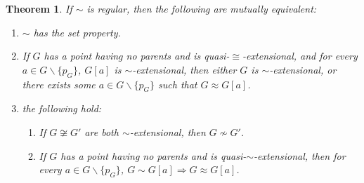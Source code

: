 \documentclass{amsart}
\newtheorem{theorem}{Theorem}
\begin{document}
\begin{theorem}
    If $\sim$ is regular, then the following are mutually equivalent:
    \begin{enumerate}[label=(\Roman*)]
        \item $\sim$ has the set property.
        \item If $G$ has a point having no parents and is quasi-$\cong$-extensional, and for every $a\in G\backslash\{p_G\}$, $G[a]$ is $\sim$-extensional, then either $G$ is $\sim$-extensional, or there exists some $a\in G\backslash\{p_G\}$ such that $G\approx G[a]$.
        \item the following hold:
            \begin{enumerate}[label=(\roman*)]
                \item If $G\not\cong G'$ are both $\sim$-extensional, then $G\not\sim G'$.
                \item If $G$ has a point having no parents and is quasi-$\sim$-extensional, then for every $a\in G\backslash\{p_G\}$, $G\sim G[a]\Rightarrow G\approx G[a]$.
            \end{enumerate}
    \end{enumerate}
\end{theorem}
\end{document}
